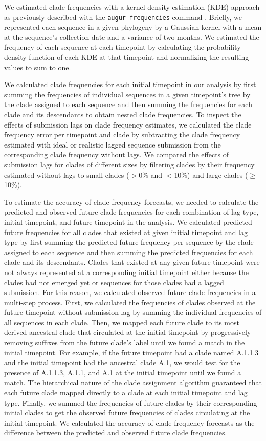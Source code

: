 \documentclass[9pt,lineno]{elife}
\begin{document}
We estimated clade frequencies with a kernel density estimation (KDE) approach as previously described \citep{Huddleston2020} with the \texttt{augur frequencies} command \citep{Huddleston2021}.
Briefly, we represented each sequence in a given phylogeny by a Gaussian kernel with a mean at the sequence's collection date and a variance of two months.
We estimated the frequency of each sequence at each timepoint by calculating the probability density function of each KDE at that timepoint and normalizing the resulting values to sum to one.

We calculated clade frequencies for each initial timepoint in our analysis by first summing the frequencies of individual sequences in a given timepoint's tree by the clade assigned to each sequence and then summing the frequencies for each clade and its descendants to obtain nested clade frequencies.
To inspect the effects of submission lags on clade frequency estimates, we calculated the clade frequency error per timepoint and clade by subtracting the clade frequency estimated with ideal or realistic lagged sequence submission from the corresponding clade frequency without lags.
We compared the effects of submission lags for clades of different sizes by filtering clades by their frequency estimated without lags to small clades ($>$0\% and $<$10\%) and large clades ($\ge$10\%).

To estimate the accuracy of clade frequency forecasts, we needed to calculate the predicted and observed future clade frequencies for each combination of lag type, initial timepoint, and future timepoint in the analysis.
We calculated predicted future frequencies for all clades that existed at given initial timepoint and lag type by first summing the predicted future frequency per sequence by the clade assigned to each sequence and then summing the predicted frequencies for each clade and its descendants.
Clades that existed at any given future timepoint were not always represented at a corresponding initial timepoint either because the clades had not emerged yet or sequences for those clades had a lagged submission.
For this reason, we calculated observed future clade frequencies in a multi-step process.
First, we calculated the frequencies of clades observed at the future timepoint without submission lag by summing the individual frequencies of all sequences in each clade.
Then, we mapped each future clade to its most derived ancestral clade that circulated at the initial timepoint by progressively removing suffixes from the future clade's label until we found a match in the initial timepoint.
For example, if the future timepoint had a clade named A.1.1.3 and the initial timepoint had the ancestral clade A.1, we would test for the presence of A.1.1.3, A.1.1, and A.1 at the initial timepoint until we found a match.
The hierarchical nature of the clade assignment algorithm guaranteed that each future clade mapped directly to a clade at each initial timepoint and lag type.
Finally, we summed the frequencies of future clades by their corresponding initial clades to get the observed future frequencies of clades circulating at the initial timepoint.
We calculated the accuracy of clade frequency forecasts as the difference between the predicted and observed future clade frequencies.
\end{document}
